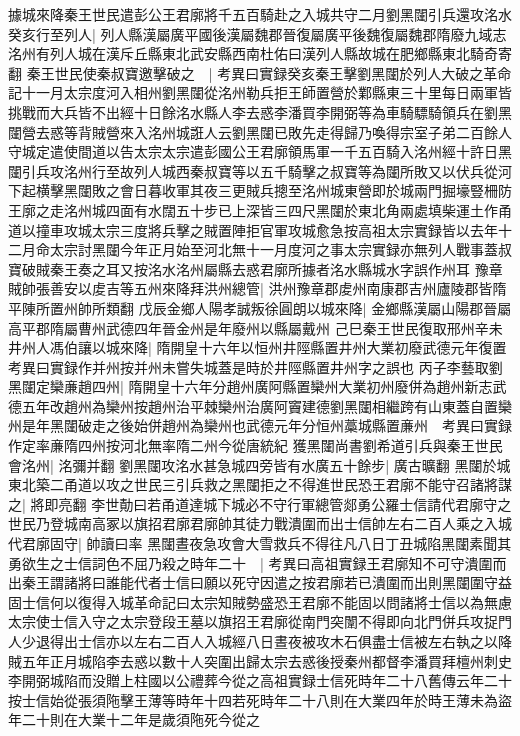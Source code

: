 據城來降秦王世民遣彭公王君廓將千五百騎赴之入城共守二月劉黑闥引兵還攻洺水癸亥行至列人|{
	列人縣漢屬廣平國後漢屬魏郡晉復屬廣平後魏復屬魏郡隋廢九域志洺州有列人城在漢斥丘縣東北武安縣西南杜佑曰漢列人縣故城在肥鄉縣東北騎奇寄翻}
秦王世民使秦叔寶邀擊破之　|{
	考異曰實録癸亥秦王擊劉黑闥於列人大破之革命記十一月太宗度河入相州劉黑闥從洺州勒兵拒王師置營於鄴縣東三十里每日兩軍皆挑戰而大兵皆不出經十日餘洺水縣人李去惑李潘買李開弼等為車騎驃騎領兵在劉黑闥營去惑等背賊營來入洺州城誑人云劉黑闥已敗先走得歸乃喚得宗室子弟二百餘人守城定遣使間道以告太宗太宗遣彭國公王君廓領馬軍一千五百騎入洺州經十許日黑闥引兵攻洺州行至故列人城西秦叔寶等以五千騎擊之叔寶等為闥所敗又以伏兵從河下起横擊黑闥敗之會日暮收軍其夜三更賊兵摠至洺州城東營即於城兩門掘壕豎柵防王廓之走洺州城四面有水闊五十步已上深皆三四尺黑闥於東北角兩處填柴運土作甬道以撞車攻城太宗三度將兵擊之賊置陣拒官軍攻城愈急按高祖太宗實録皆以去年十二月命太宗討黑闥今年正月始至河北無十一月度河之事太宗實録亦無列人戰事蓋叔寶破賊秦王奏之耳又按洺水洺州屬縣去惑君廓所據者洺水縣城水字誤作州耳}
豫章賊帥張善安以䖍吉等五州來降拜洪州總管|{
	洪州豫章郡䖍州南康郡吉州廬陵郡皆隋平陳所置州帥所類翻}
戊辰金鄉人陽孝誠叛徐圓朗以城來降|{
	金鄉縣漢屬山陽郡晉屬高平郡隋屬曹州武德四年晉金州是年廢州以縣屬戴州}
己巳秦王世民復取邢州辛未井州人馮伯讓以城來降|{
	隋開皇十六年以恒州井陘縣置井州大業初廢武德元年復置　考異曰實録作并州按并州未嘗失城蓋是時於井陘縣置井州字之誤也}
丙子李藝取劉黑闥定欒亷趙四州|{
	隋開皇十六年分趙州廣阿縣置欒州大業初州廢併為趙州新志武德五年改趙州為欒州按趙州治平棘欒州治廣阿竇建德劉黑闥相繼跨有山東蓋自置欒州是年黑闥破走之後始併趙州為欒州也武德元年分恒州藁城縣置亷州　考異曰實録作定率亷隋四州按河北無率隋二州今從唐統紀}
獲黑闥尚書劉希道引兵與秦王世民會洺州|{
	洺彌并翻}
劉黑闥攻洺水甚急城四旁皆有水廣五十餘步|{
	廣古曠翻}
黑闥於城東北築二甬道以攻之世民三引兵救之黑闥拒之不得進世民恐王君廓不能守召諸將謀之|{
	將即亮翻}
李世勣曰若甬道達城下城必不守行軍總管郯勇公羅士信請代君廓守之世民乃登城南高冢以旗招君廓君廓帥其徒力戰潰圍而出士信帥左右二百人乘之入城代君廓固守|{
	帥讀曰率}
黑闥晝夜急攻會大雪救兵不得往凡八日丁丑城陷黑闥素聞其勇欲生之士信詞色不屈乃殺之時年二十　|{
	考異曰高祖實録王君廓知不可守潰圍而出秦王謂諸將曰誰能代者士信曰願以死守因遣之按君廓若已潰圍而出則黑闥圍守益固士信何以復得入城革命記曰太宗知賊勢盛恐王君廓不能固以問諸將士信以為無慮太宗使士信入守之太宗登段王墓以旗招王君廓從南門突闈不得即向北門併兵攻捉門人少退得出士信亦以左右二百人入城經八日晝夜被攻木石俱盡士信被左右執之以降賊五年正月城陷李去惑以數十人突圍出歸太宗去惑後授秦州都督李潘買拜檀州刺史李開弼城陷而没贈上柱國以公禮葬今從之高祖實録士信死時年二十八舊傳云年二十按士信始從張須陁擊王薄等時年十四若死時年二十八則在大業四年於時王薄未為盜年二十則在大業十二年是歲須陁死今從之}
